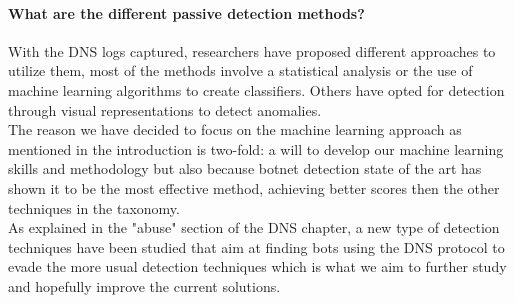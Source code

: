 \paragraph{What are the different passive detection methods?}
With the DNS logs captured, researchers have proposed different approaches to utilize them, most of the methods involve a statistical analysis or the use of machine learning algorithms to create classifiers. Others have opted for detection through visual representations to detect anomalies.\\
The reason we have decided to focus on the machine learning approach as mentioned in the introduction is two-fold: a will to develop our machine learning skills and methodology but also because botnet detection state of the art has shown it to be the most effective method, achieving better scores then the other techniques in the taxonomy.\\
As explained in the "abuse" section of the DNS chapter, a new type of detection techniques have been studied that aim at finding bots using the DNS protocol to evade the more usual detection techniques which is what we aim to further study and hopefully improve the current solutions.


